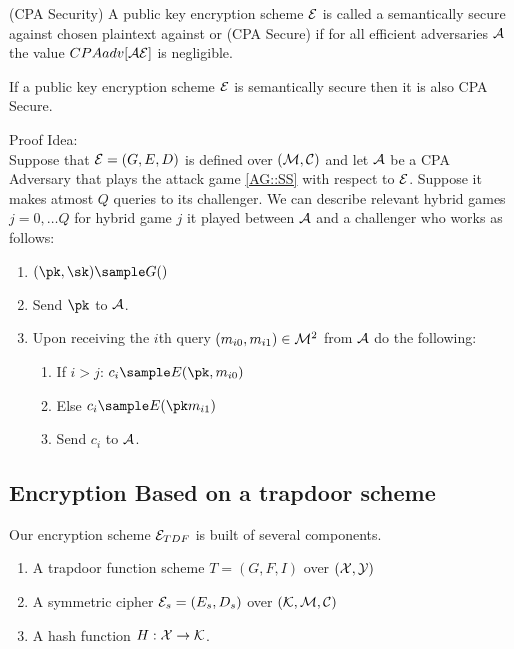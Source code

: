 \begin{attackGame}(CPA Security)
A public key encryption scheme \(\mathcal{E}\) is called a semantically secure against chosen plaintext against or (CPA Secure) if for all efficient adversaries \(\mathcal{A}\) the value \(CPAadv[\mathcal{A} \mathcal{E}] \) is negligible. 

\end{attackGame}

\begin{theorem}
    If a public key encryption scheme \(\mathcal{E}\) is semantically secure then it is also CPA Secure. 
\end{theorem}

Proof Idea: \\ 
Suppose that \(\mathcal{E}= (G,E,D) \) is defined over \((\mathcal{M}, \mathcal{C})\) and let \(\mathcal{A}\) be a CPA Adversary that plays the attack game \ref{AG::SS}  with respect to \(\mathcal{E}\). Suppose it makes atmost \(Q\) queries to its challenger. We can describe relevant hybrid games \(j=0,\ldots Q \) for hybrid game \(j\) it played between \(\mathcal{A}\) and a challenger who works as follows: 
\begin{enumerate}
    \item \((\pk, \sk) \sample G()\)
    \item Send \(\pk\) to \(\mathcal{A}\). 
    \item Upon receiving the \(i\)th query \((m_{i0}, m_{i1}) \in \mathcal{M}^{2} \) from \(\mathcal{A}\) do the following: 
    \begin{enumerate}
        \item If \(i > j\): \(c_i \sample E(\pk, m_{i0})\)
        \item Else \(c_i \sample E(\pk m_{i1})\)
        \item Send \(c_i\) to \(\mathcal{A}\).     
    \end{enumerate}     
\end{enumerate}     

\subsection{Encryption Based on a trapdoor scheme}

Our encryption scheme \(\mathcal{E}_{TDF}\) is built of several components. 
\begin{enumerate}
    \item A trapdoor function scheme \(T = (G,F,I)\) over \((\mathcal{X},\mathcal{Y})\)
    \item A symmetric cipher \(\mathcal{E}_s = (E_s, D_s)\) over \((\mathcal{K}, \mathcal{M}, \mathcal{C})\) 
    \item A hash function \(H: \mathcal{X} \to \mathcal{K}\).    
\end{enumerate} 


